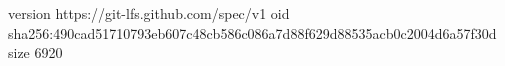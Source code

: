 version https://git-lfs.github.com/spec/v1
oid sha256:490cad51710793eb607c48cb586c086a7d88f629d88535acb0c2004d6a57f30d
size 6920

